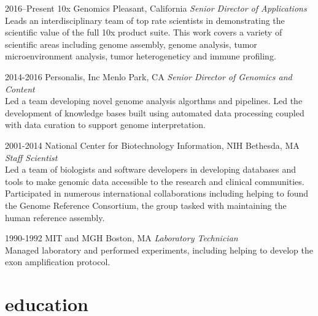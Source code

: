 \documentclass[]{dmc-cv} %
\begin{document}
\begin{entrylist}


\entry
{2016--Present}
{10x Genomics}
{Pleasant, California}
{\emph{Senior Director of Applications} \\
Leads an interdisciplinary team of top rate scientists in demonstrating the scientific value of the full
10x product suite. This work covers a variety of scientific areas including genome assembly, genome analysis,
tumor microenvironment analysis, tumor heterogeneticy and immune profiling.
}

\entry
{2014-2016}
{Personalis, Inc}
{Menlo Park, CA}
{\emph{Senior Director of Genomics and Content} \\
Led a team developing novel genome analysis algorthms and pipelines. Led the development of knowledge bases built using automated data processing coupled with data curation to support genome interpretation.
}

\entry
{2001-2014}
{National Center for Biotechnology Information, NIH}
{Bethesda, MA}
{\emph{Staff Scientist} \\
Led a team of biologists and software developers in developing databases and tools to make genomic data accessible to the research and clinical communities. Participated in numerous international collaborations including helping to found the Genome Reference Consortium, the group tasked with maintaining the human reference assembly.
}

\entry
{1990-1992}
{MIT and MGH}
{Boston, MA}
{\emph{Laboratory Technician}\\
Managed laboratory and performed experiments, including helping to develop the exon amplification protocol.
}

\end{entrylist}


\section{education}
\end{document}
